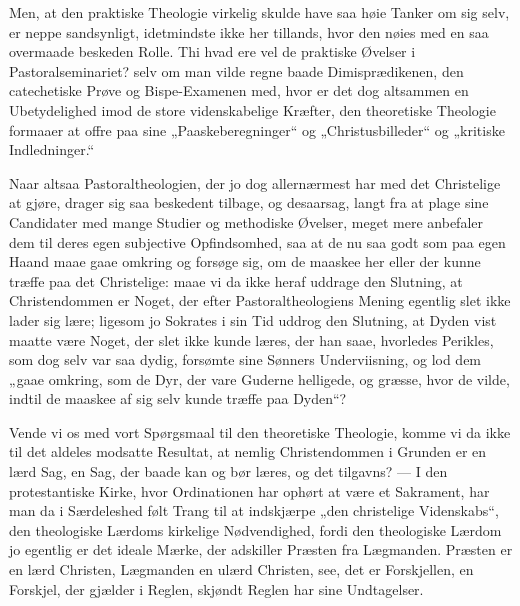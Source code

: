 \documentclass[12pt,a4paper]{book}
\newcommand{\opage}[1]{\marginnote{\footnotesize\textit{[#1]}}}
\begin{document}
Men, at den praktiske Theologie virkelig skulde have saa høie Tanker om sig
selv, er neppe sandsynligt, idetmindste ikke her tillands, hvor den nøies
med en saa overmaade beskeden Rolle. Thi hvad ere vel de praktiske Øvelser
i Pastoralseminariet? selv
\opage{131} om man vilde regne baade Dimisprædikenen, den catechetiske Prøve og
Bispe-Examenen med, hvor er det dog altsammen en Ubetydelighed imod de
store videnskabelige Kræfter, den theoretiske Theologie formaaer at offre
paa sine „Paaskeberegninger“ og „Christusbilleder“ og „kritiske
Indledninger.“

Naar altsaa Pastoraltheologien, der jo dog allernærmest har med det
Christelige at gjøre, drager sig saa beskedent tilbage, og desaarsag, langt
fra at plage sine Candidater med mange Studier og methodiske Øvelser, meget
mere anbefaler dem til deres egen subjective Opfindsomhed, saa at de nu saa
godt som paa egen Haand maae gaae omkring og forsøge sig, om de maaskee her
eller der kunne træffe paa det Christelige: maae vi da ikke heraf uddrage
den Slutning, at Christendommen er Noget, der efter Pastoraltheologiens
Mening egentlig slet ikke lader sig lære; ligesom jo Sokrates i sin Tid
uddrog den Slutning, at Dyden vist maatte være Noget, der slet ikke kunde
læres, der han saae, hvorledes Perikles, som dog selv var saa dydig,
forsømte sine Sønners Underviisning, og lod dem „gaae omkring, som de Dyr,
der vare Guderne helligede, og græsse, hvor de vilde, indtil de maaskee af
sig selv kunde træffe paa Dyden“?

Vende vi os med vort Spørgsmaal til den theoretiske Theologie, komme vi da
ikke til det aldeles modsatte Resultat, at nemlig Christendommen i Grunden
er en lærd Sag, en Sag, der baade kan og bør læres, og det tilgavns? --- I
den protestantiske Kirke, hvor Ordinationen har ophørt at være et
Sakrament, har man da i Særdeleshed følt Trang til at indskjærpe „den
christelige Videnskabs“, den theologiske Lærdoms kirkelige Nødvendighed,
fordi den theologiske Lærdom jo egentlig er det ideale Mærke, der adskiller
Præsten fra Lægmanden. Præsten er en lærd Christen, Lægmanden en ulærd
Christen, see, det er Forskjellen, en Forskjel, der gjælder i Reglen,
skjøndt Reglen har sine Undtagelser.
\end{document}
